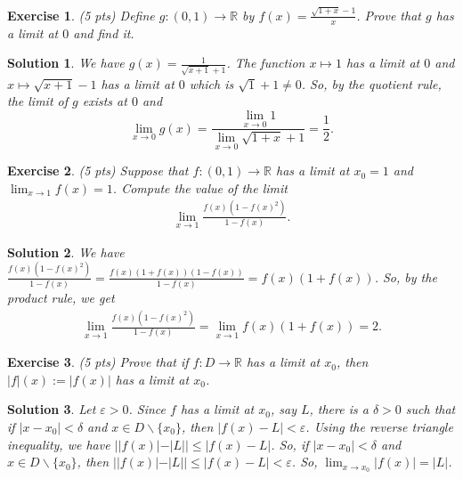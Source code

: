\documentclass[12pt]{article}
\newcommand{\bR}{\mathbb{R}}
\newcommand{\ra}{\rightarrow}
\theoremstyle{plain}
\newtheorem{exer}{\textbf{Exercise}}}
\theoremstyle{plain}
\newtheorem*{sol}{\textbf{Solution}}}
\theoremstyle{plain}
\theoremstyle{plain}
\begin{document}

\begin{exer}
(5 pts)
Define $g: (0, 1) \ra \bR$ by $f(x) = \frac{\sqrt{1 + x} - 1}{x}$. Prove that $g$ has a limit at $0$ and find it.
\end{exer}
\begin{sol}
We have $g(x) = \frac{1}{\sqrt{x + 1} + 1}$. The function $x \mapsto 1$ has a limit at $0$ and $x \mapsto \sqrt{x + 1} - 1$ has a limit at $0$ which is $\sqrt{1} + 1 \neq 0$. So, by the quotient rule, the limit of $g$ exists at $0$ and
	\begin{equation*}
	\lim_{x \ra 0} g(x) = \frac{\lim_{x \ra 0} 1}{\lim_{x \ra 0} \sqrt{1 + x} + 1} = \frac{1}{2} .
	\end{equation*}
\end{sol}

\begin{exer}
(5 pts)
Suppose that $f: (0, 1) \ra \bR$ has a limit at $x_0 = 1$ and $\lim_{x \ra 1} f(x) = 1$. Compute the value of the limit
	\begin{align*}
	\lim_{x \ra 1} \frac{f(x) (1 - f(x)^2)}{1 - f(x)} .
	\end{align*}
\end{exer}
\begin{sol}
We have $\frac{f(x) (1 - f(x)^2)}{1 - f(x)} = \frac{f(x) (1 + f(x)) (1 - f(x))}{1 - f(x)} = f(x) (1 + f(x))$. So, by the product rule, we get
	\begin{align*}
	\lim_{x \ra 1} \frac{f(x) (1 - f(x)^2)}{1 - f(x)} = \lim_{x \ra 1} f(x) (1 + f(x)) = 2 .
	\end{align*}
\end{sol}

\begin{exer}
(5 pts)
Prove that if $f: D \ra \bR$ has a limit at $x_0$, then $|f|(x) := |f(x)|$ has a limit at $x_0$.
\end{exer}
\begin{sol}
Let $\varepsilon > 0$. Since $f$ has a limit at $x_0$, say $L$, there is a $\delta > 0$ such that if $|x - x_0| < \delta$ and $x \in D\backslash \{ x_0 \}$, then $|f(x) - L| < \varepsilon$. Using the reverse triangle inequality, we have $||f(x) | - |L|| \leq |f(x) - L|$. So, if $|x - x_0| < \delta$ and $x \in D \backslash \{ x_0 \}$, then $| |f(x)| - |L| | \leq |f(x) - L| < \varepsilon$. So, $\lim_{x \ra x_0} |f(x)| = |L|$.
\end{sol}
\end{document}

